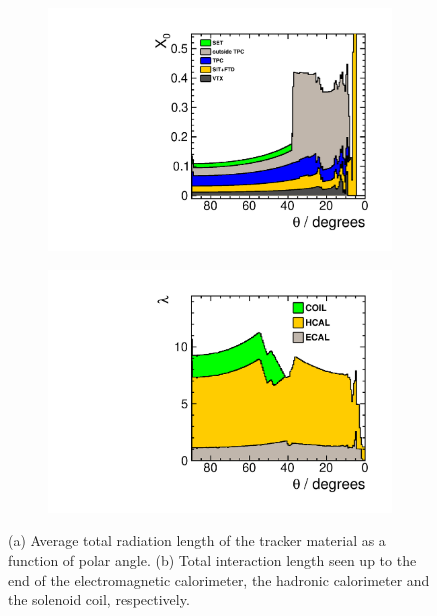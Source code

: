 \begin{figure}[th!]

\begin{subfigure}{0.45\textwidth}
\includegraphics[width=\textwidth]{Modelling/fig/ILD_l5_v02_matbudget_tracker_85deg.pdf}
 \caption{ \label{fig:det:material:x0}}
\end{subfigure}
\begin{subfigure}{0.45\textwidth}
\includegraphics[width=\textwidth]{Modelling/fig/ILD_l5_v02_matbudget_calo_85deg.pdf}
 \caption{ \label{fig:det:material:lambda}}
\end{subfigure}
\caption[Material in the ILD detector]{\label{fig:det:material} (a) Average total radiation length of the tracker material as a function of polar angle. (b) Total interaction length seen up to the end of the electromagnetic calorimeter, the hadronic calorimeter and the solenoid coil, respectively.}
\end{figure}

